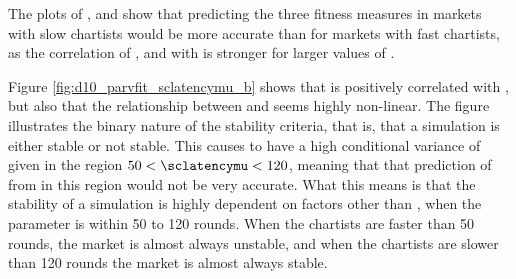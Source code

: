 The plots of \overshoot, \stdev and \timetoreachnewfundamental show that predicting the three fitness measures in markets with slow chartists would be more accurate than for markets with fast chartists, as the correlation of \overshoot, \stdev and \timetoreachnewfundamental with \sclatencymu is stronger for larger values of \sclatencymu. 

Figure \ref{fig:d10_parvfit_sclatencymu_b} shows that \sclatencymu is positively correlated with \roundstable, but also that the relationship between \sclatencymu and \roundstable seems highly non-linear. The figure illustrates the binary nature of the stability criteria, that is, that a simulation is either stable or not stable. This causes \roundstable to have a high conditional variance of \roundstable given \sclatencymu in the region $50 < \sclatencymu < 120$, meaning that that prediction of \roundstable from \sclatencymu in this region would not be very accurate. What this means is that the stability of a simulation is highly dependent on factors other than \sclatencymu, when the parameter is within 50 to 120 rounds. When the chartists are faster than 50 rounds, the market is almost always unstable, and when the chartists are slower than 120 rounds the market is almost always stable. 

